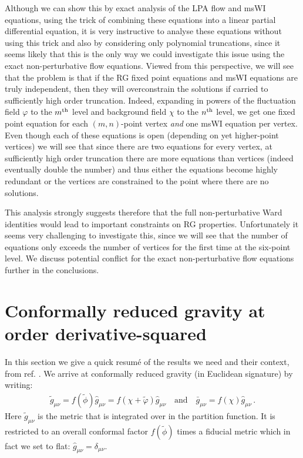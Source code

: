 \documentclass[11pt]{book} %
\newcommand{\vp}{\varphi}
\numberwithin{equation}{chapter}
\begin{document}
Although we can show this by exact analysis of the LPA flow and msWI equations,
using the trick of combining these equations into a linear partial differential equation,
it is very instructive to analyse these equations without using this trick and also by considering
only polynomial truncations, since it seems likely that this is the only way we could investigate this
issue using the exact non-perturbative flow equations. Viewed from this perspective,
we will see that the problem is that if the RG fixed point equations and msWI equations are truly independent,
then they will overconstrain the solutions if carried to sufficiently high order truncation.
Indeed, expanding in powers of the fluctuation field $\vp$ to the $m^{\rm th}$ level and
background field $\chi$ to the $n^{\rm th}$ level, we get one fixed point equation for
each $(m,n)$-point vertex \emph{and} one msWI equation per vertex.
Even though each of these equations is open (depending on yet higher-point vertices) we will
see that since there are two equations for every vertex, at sufficiently high order truncation there
are more equations than vertices (indeed eventually double the number) and thus either the equations
become highly redundant or the vertices are constrained to the point where there are no solutions.

This analysis strongly suggests therefore that the full non-perturbative Ward identities would lead
to important constraints on RG properties. Unfortunately it seems very challenging to investigate this,
since we will see that the number of equations only exceeds the number of vertices for the first time
at the six-point level.
We discuss potential conflict for the exact non-perturbative flow equations further in the conclusions.


\section{Conformally reduced gravity at order derivative-squared}
\label{sec:review}

In this section we give a quick resum\'e of the results we need and their context,
from ref. \cite{Dietz:2015owa}.
We arrive at conformally reduced gravity (in Euclidean signature) by writing:
\begin{align}
  \tilde g_{\mu\nu} = f(\tilde\phi) \hat g_{\mu\nu} = f(\chi +\tilde\varphi )\hat g_{\mu\nu}
  \quad \text{and} \quad
  \bar g_{\mu\nu} = f(\chi)\hat g_{\mu\nu} \,.
  \label{conformal-reduction}
\end{align}
Here $\tilde g_{\mu\nu}$ is the metric that is integrated over in the partition function.
It is restricted to an overall conformal factor $f(\tilde\phi)$ times a fiducial metric which
in fact we set to flat: $\hat g_{\mu\nu}=\delta_{\mu\nu}$.
\end{document}
